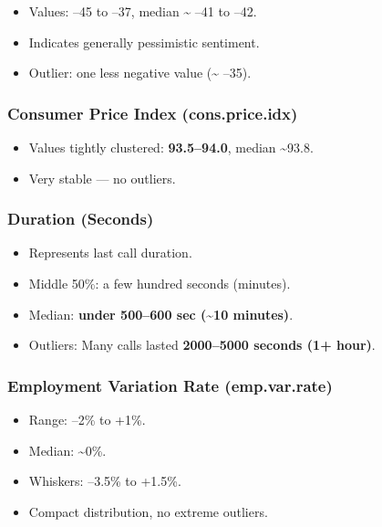 \documentclass[
]{article}
\providecommand{\tightlist}{%
  \setlength{\itemsep}{0pt}\setlength{\parskip}{0pt}}
\begin{document}
\begin{itemize}
\tightlist
\item
  Values: --45 to --37, median \textasciitilde{} --41 to --42.\\
\item
  Indicates generally pessimistic sentiment.\\
\item
  Outlier: one less negative value (\textasciitilde{} --35).
\end{itemize}

\subsubsection{Consumer Price Index
(cons.price.idx)}\label{consumer-price-index-cons.price.idx}

\begin{itemize}
\tightlist
\item
  Values tightly clustered: \textbf{93.5--94.0}, median
  \textasciitilde93.8.\\
\item
  Very stable --- no outliers.
\end{itemize}

\subsubsection{Duration (Seconds)}\label{duration-seconds}

\begin{itemize}
\tightlist
\item
  Represents last call duration.\\
\item
  Middle 50\%: a few hundred seconds (minutes).\\
\item
  Median: \textbf{under 500--600 sec (\textasciitilde10 minutes)}.\\
\item
  Outliers: Many calls lasted \textbf{2000--5000 seconds (1+ hour)}.
\end{itemize}

\subsubsection{Employment Variation Rate
(emp.var.rate)}\label{employment-variation-rate-emp.var.rate}

\begin{itemize}
\tightlist
\item
  Range: --2\% to +1\%.\\
\item
  Median: \textasciitilde0\%.\\
\item
  Whiskers: --3.5\% to +1.5\%.\\
\item
  Compact distribution, no extreme outliers.
\end{itemize}
\end{document}
